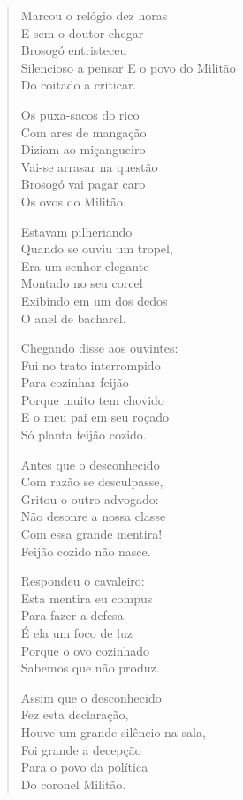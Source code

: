 \begin{verse}
Marcou o relógio dez horas\\
E sem o doutor chegar\\
Brosogó entristeceu\\
Silencioso a pensar
E o povo do Militão\\
Do coitado a criticar.

Os puxa-sacos do rico\\
Com ares de mangação\\
Diziam ao miçangueiro\\
Vai-se arrasar na questão\\
Brosogó vai pagar caro\\
Os ovos do Militão.

Estavam pilheriando\\
Quando se ouviu um tropel,\\
Era um senhor elegante\\
Montado no seu corcel\\
Exibindo em um dos dedos\\
O anel de bacharel.

Chegando disse aos ouvintes:\\
Fui no trato interrompido\\
Para cozinhar feijão\\
Porque muito tem chovido\\
E o meu pai em seu roçado\\
Só planta feijão cozido.

Antes que o desconhecido\\
Com razão se desculpasse,\\
Gritou o outro advogado:\\
Não desonre a nossa classe\\
Com essa grande mentira!\\
Feijão cozido não nasce.

Respondeu o cavaleiro:\\
Esta mentira eu compus\\
Para fazer a defesa\\
É ela um foco de luz\\
Porque o ovo cozinhado\\
Sabemos que não produz.

Assim que o desconhecido\\
Fez esta declaração,\\
Houve um grande silêncio na sala,\\
Foi grande a decepção\\
Para o povo da política\\
Do coronel Militão.


\end{verse}
